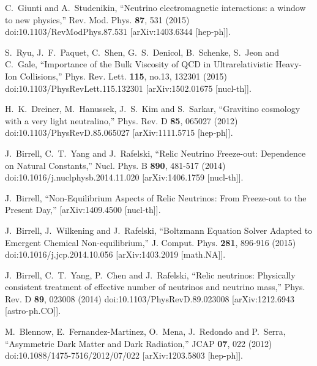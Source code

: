 \documentclass[universe,article,submit,moreauthors,pdftex,a4paper]{Definitions/mdpi}
\begin{document}
\begin{thebibliography}{99}
C.~Giunti and A.~Studenikin,
``Neutrino electromagnetic interactions: a window to new physics,''
Rev. Mod. Phys. \textbf{87}, 531 (2015)
doi:10.1103/RevModPhys.87.531
[arXiv:1403.6344 [hep-ph]].

S.~Ryu, J.~F.~Paquet, C.~Shen, G.~S.~Denicol, B.~Schenke, S.~Jeon and C.~Gale,
``Importance of the Bulk Viscosity of QCD in Ultrarelativistic Heavy-Ion Collisions,''
Phys. Rev. Lett. \textbf{115}, no.13, 132301 (2015)
doi:10.1103/PhysRevLett.115.132301
[arXiv:1502.01675 [nucl-th]].

H.~K.~Dreiner, M.~Hanussek, J.~S.~Kim and S.~Sarkar,
``Gravitino cosmology with a very light neutralino,''
Phys. Rev. D \textbf{85}, 065027 (2012)
doi:10.1103/PhysRevD.85.065027
[arXiv:1111.5715 [hep-ph]].

J.~Birrell, C.~T.~Yang and J.~Rafelski,
``Relic Neutrino Freeze-out: Dependence on Natural Constants,''
Nucl. Phys. B \textbf{890}, 481-517 (2014)
doi:10.1016/j.nuclphysb.2014.11.020
[arXiv:1406.1759 [nucl-th]].

J.~Birrell,
``Non-Equilibrium Aspects of Relic Neutrinos: From Freeze-out to the Present Day,''
[arXiv:1409.4500 [nucl-th]].

J.~Birrell, J.~Wilkening and J.~Rafelski,
``Boltzmann Equation Solver Adapted to Emergent Chemical Non-equilibrium,''
J. Comput. Phys. \textbf{281}, 896-916 (2015)
doi:10.1016/j.jcp.2014.10.056
[arXiv:1403.2019 [math.NA]].

J.~Birrell, C.~T.~Yang, P.~Chen and J.~Rafelski,
``Relic neutrinos: Physically consistent treatment of effective number of neutrinos and neutrino mass,''
Phys. Rev. D \textbf{89}, 023008 (2014)
doi:10.1103/PhysRevD.89.023008
[arXiv:1212.6943 [astro-ph.CO]].

M.~Blennow, E.~Fernandez-Martinez, O.~Mena, J.~Redondo and P.~Serra,
``Asymmetric Dark Matter and Dark Radiation,''
JCAP \textbf{07}, 022 (2012)
doi:10.1088/1475-7516/2012/07/022
[arXiv:1203.5803 [hep-ph]].


\end{thebibliography}
\end{document}
